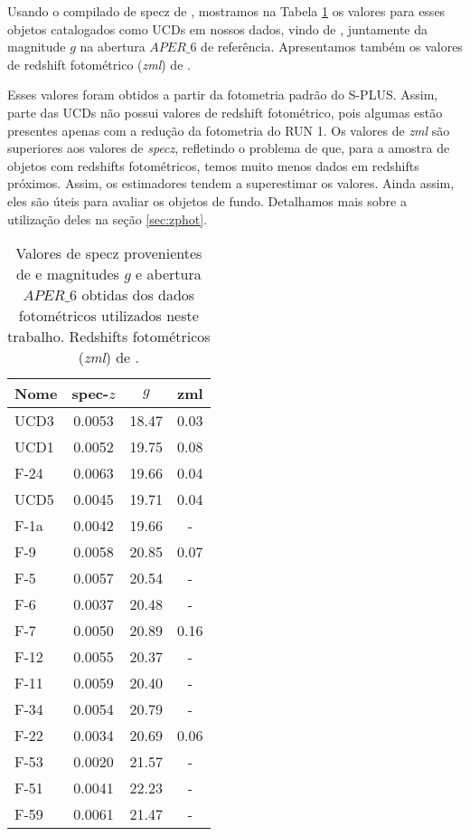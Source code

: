 Usando o compilado de \ac{specz} de \cite{Lima_2024}, mostramos na Tabela \ref{tab:ucds_know_z_gmag} os valores para esses objetos catalogados como UCDs em nossos dados, vindo de \cite{catalog_ucds}, juntamente da magnitude $g$ na abertura $APER\_6$ de referência. Apresentamos também os valores de redshift fotométrico (\textit{zml}) de \citep{erik_photoz_2024}. 

Esses valores foram obtidos a partir da fotometria padrão do S-PLUS. Assim, parte das UCDs não possui valores de redshift fotométrico, pois algumas estão presentes apenas com a redução da fotometria do RUN 1. Os valores de \textit{zml} são superiores aos valores de \textit{specz}, refletindo o problema de que, para a amostra de objetos com redshifts fotométricos, temos muito menos dados em redshifts próximos. Assim, os estimadores tendem a superestimar os valores. Ainda assim, eles são úteis para avaliar os objetos de fundo. Detalhamos mais sobre a utilização deles na seção \ref{sec:zphot}.

\begin{table}[!ht]
    \centering
    \caption{Valores de \ac{specz} provenientes de \cite{Lima_2024} e magnitudes $g$ e abertura $APER\_6$ obtidas dos dados fotométricos utilizados neste trabalho. Redshifts fotométricos (\textit{zml}) de \cite{erik_photoz_2024}.}
    \begin{tabular}{lccc}
        \toprule
        Nome & spec-$z$ & $g$ & zml \\
        \midrule
        UCD3 & 0.0053 & 18.47 & 0.03\\
        UCD1 & 0.0052 & 19.75 & 0.08\\
        F-24 & 0.0063 & 19.66 & 0.04\\
        UCD5 & 0.0045 & 19.71 & 0.04\\
        F-1a & 0.0042 & 19.66 & -\\
        F-9  & 0.0058 & 20.85 & 0.07\\
        F-5  & 0.0057 & 20.54 & -\\
        F-6  & 0.0037 & 20.48 & -\\
        F-7  & 0.0050 & 20.89 & 0.16\\
        F-12 & 0.0055 & 20.37 & -\\
        F-11 & 0.0059 & 20.40 & -\\
        F-34 & 0.0054 & 20.79 & -\\
        F-22 & 0.0034 & 20.69 & 0.06\\
        F-53 & 0.0020 & 21.57 & -\\
        F-51 & 0.0041 & 22.23 & -\\
        F-59 & 0.0061 & 21.47 & -\\
        \bottomrule
    \end{tabular}
    \label{tab:ucds_know_z_gmag}
\end{table}

